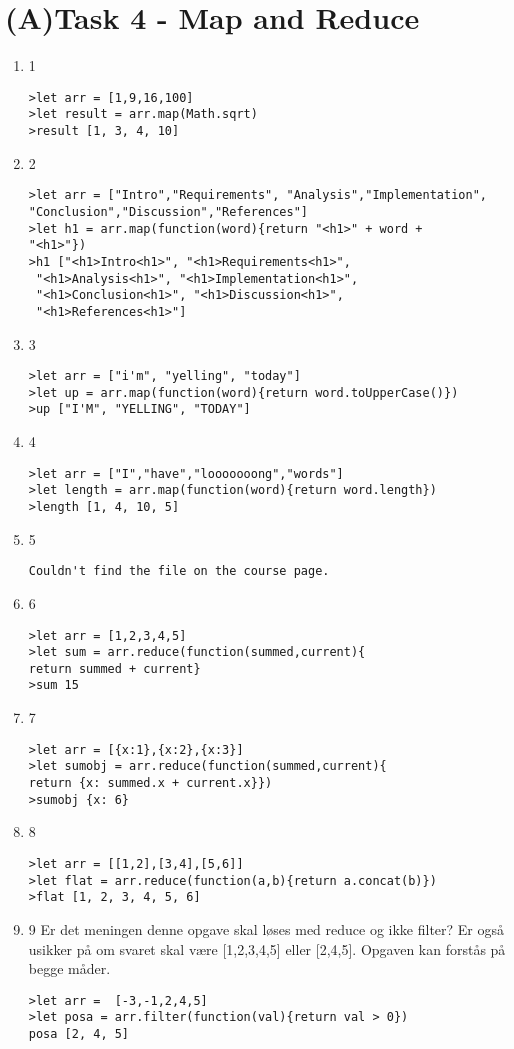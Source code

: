\documentclass[a4paper,12pt]{article}
\begin{document}
\section{(A)Task 4 - Map and Reduce}
\begin{enumerate}
\item 1
\begin{lstlisting}
>let arr = [1,9,16,100]
>let result = arr.map(Math.sqrt)
>result [1, 3, 4, 10]
\end{lstlisting}
\item 2
\begin{lstlisting}
>let arr = ["Intro","Requirements", "Analysis","Implementation",
"Conclusion","Discussion","References"]
>let h1 = arr.map(function(word){return "<h1>" + word + 
"<h1>"})
>h1 ["<h1>Intro<h1>", "<h1>Requirements<h1>",
 "<h1>Analysis<h1>", "<h1>Implementation<h1>",
 "<h1>Conclusion<h1>", "<h1>Discussion<h1>",
 "<h1>References<h1>"]
\end{lstlisting}
\item 3
\begin{lstlisting}
>let arr = ["i'm", "yelling", "today"]
>let up = arr.map(function(word){return word.toUpperCase()})
>up ["I'M", "YELLING", "TODAY"]
\end{lstlisting}
\item 4
\begin{lstlisting}
>let arr = ["I","have","looooooong","words"]
>let length = arr.map(function(word){return word.length})
>length [1, 4, 10, 5]
\end{lstlisting}
\item 5
\begin{lstlisting}
Couldn't find the file on the course page.
\end{lstlisting}
\item 6
\begin{lstlisting}
>let arr = [1,2,3,4,5]
>let sum = arr.reduce(function(summed,current){
return summed + current}
>sum 15
\end{lstlisting}
\item 7
\begin{lstlisting}
>let arr = [{x:1},{x:2},{x:3}]
>let sumobj = arr.reduce(function(summed,current){
return {x: summed.x + current.x}})
>sumobj {x: 6}
\end{lstlisting}
\clearpage
\item 8
\begin{lstlisting}
>let arr = [[1,2],[3,4],[5,6]]
>let flat = arr.reduce(function(a,b){return a.concat(b)})
>flat [1, 2, 3, 4, 5, 6]
\end{lstlisting}
\item 9
Er det meningen denne opgave skal løses med reduce og ikke filter? 
Er også usikker på om svaret skal være [1,2,3,4,5] eller [2,4,5]. 
Opgaven kan forstås på begge måder.
\begin{lstlisting}
>let arr =  [-3,-1,2,4,5]
>let posa = arr.filter(function(val){return val > 0})
posa [2, 4, 5]
\end{lstlisting}

\end{enumerate}
\end{document}
